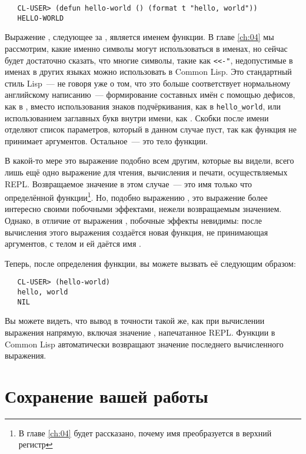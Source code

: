 \begin{verbatim}
   CL-USER> (defun hello-world () (format t "hello, world"))
   HELLO-WORLD
\end{verbatim}

Выражение , следующее за , является именем функции. В главе \ref{ch:04} мы
рассмотрим, какие именно символы могут использоваться в именах, но сейчас будет достаточно
сказать, что многие символы, такие как \lstinline|<<-"|, недопустимые в именах в других
языках можно использовать в Common Lisp. Это стандартный стиль Lisp~--- не говоря уже о том,
что это больше соответствует нормальному английскому написанию~--- формирование составных имён с помощью дефисов,
как в , вместо использования знаков подчёркивания, как в \lstinline|hello_world|, или
использованием заглавных букв внутри имени, как . Скобки \code{()} после имени отделяют
список параметров, который в данном случае пуст, так как функция не принимает
аргументов. Остальное~--- это тело функции.

В какой-то мере это выражение подобно всем другим, которые вы видели, всего лишь ещё одно
выражение для чтения, вычисления и печати, осуществляемых REPL. Возвращаемое значение в
этом случае~--- это имя только что определённой функции\footnote{В главе \ref{ch:04} будет рассказано,
  почему имя преобразуется в верхний регистр}. Но, подобно выражению , это выражение
более интересно своими побочными эффектами, нежели возвращаемым значением. Однако, в
отличие от выражения , побочные эффекты невидимы: после вычисления этого выражения
создаётся новая функция, не принимающая аргументов, с телом  и ей даётся имя .

Теперь, после определения функции, вы можете вызвать её следующим образом:

\begin{verbatim}
   CL-USER> (hello-world)
   hello, world
   NIL
\end{verbatim}

Вы можете видеть, что вывод в точности такой же, как при вычислении выражения 
напрямую, включая значение , напечатанное REPL. Функции в Common Lisp автоматически
возвращают значение последнего вычисленного выражения.

\section{Сохранение вашей работы}

